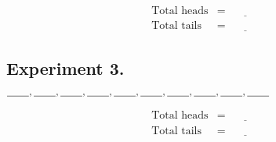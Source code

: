 \documentclass[12pt]{article}
\begin{document}
\vspace{1ex}
\begin{eqnarray*}
\mbox{Total heads} & = & \underline{\hspace{2em}} \\
\mbox{Total tails} & = & \underline{\hspace{2em}}
\end{eqnarray*}

\subsection*{Experiment 3.}

\vspace{3ex}
$\underline{\hspace{2em}},\hfill \underline{\hspace{2em}},\hfill
\underline{\hspace{2em}},\hfill \underline{\hspace{2em}},\hfill
\underline{\hspace{2em}},\hfill \underline{\hspace{2em}},\hfill
\underline{\hspace{2em}},\hfill \underline{\hspace{2em}},\hfill
\underline{\hspace{2em}},\hfill \underline{\hspace{2em}}$

\vspace{1ex}
\begin{eqnarray*}
\mbox{Total heads} & = & \underline{\hspace{2em}} \\
\mbox{Total tails} & = & \underline{\hspace{2em}}
\end{eqnarray*}
\end{document}
